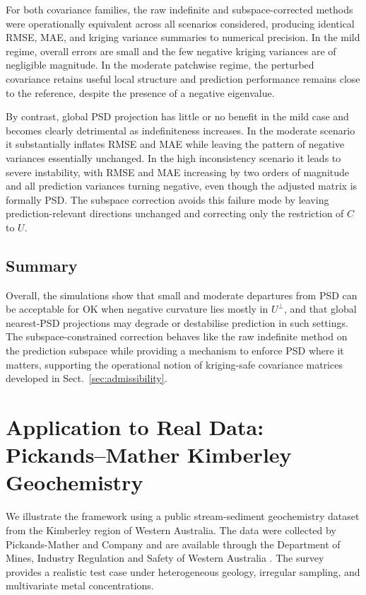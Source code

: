 \documentclass[smallextended]{svjour3}
\newcommand{\1}{\mathbf{1}}
\begin{document}
For both covariance families, the raw indefinite and subspace-corrected methods were operationally equivalent across all scenarios considered, producing identical RMSE, MAE, and kriging variance summaries to numerical precision.
In the mild regime, overall errors are small and the few negative kriging variances are of negligible magnitude. In the moderate patchwise regime, the perturbed covariance retains useful local structure and prediction performance remains close to the reference, despite the presence of a negative eigenvalue.

By contrast, global PSD projection has little or no benefit in the mild case and becomes clearly detrimental as indefiniteness increases. In the moderate scenario it substantially inflates RMSE and MAE while leaving the pattern of negative variances essentially unchanged. In the high inconsistency scenario it leads to severe instability, with RMSE and MAE increasing by two orders of magnitude and all prediction variances turning negative, even though the adjusted matrix is formally PSD. The subspace correction avoids this failure mode by leaving prediction-relevant directions unchanged and correcting only the restriction of $C$ to $U$.

\subsection{Summary}

Overall, the simulations show that small and moderate departures from PSD can be acceptable for OK when negative curvature lies mostly in $U^\perp$, and that global nearest-PSD projections may degrade or destabilise prediction in such settings. The subspace-constrained correction behaves like the raw indefinite method on the prediction subspace while providing a mechanism to enforce PSD where it matters, supporting the operational notion of kriging-safe covariance matrices developed in Sect.~\ref{sec:admissibility}.

\section{Application to Real Data: Pickands--Mather Kimberley Geochemistry}
\label{sec:real-data}

We illustrate the framework using a public stream-sediment geochemistry dataset from the Kimberley region of Western Australia. The data were collected by Pickands-Mather and Company and are available through the Department of Mines, Industry Regulation and Safety of Western Australia \citep{DMIRS2025}. The survey provides a realistic test case under
heterogeneous geology, irregular sampling, and multivariate metal concentrations.
\end{document}
